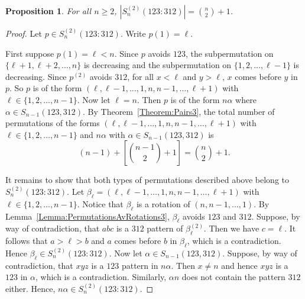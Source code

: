 \documentclass[10pt,a4paper]{amsart}
\newtheorem{proposition}[theorem]{Proposition}
\numberwithin{equation}{section}
\begin{document}
\begin{proposition}
For all $n\geq2$, $|S_n^{(2)}(123:312)|=\binom{n}{2}+1$.
\end{proposition}
\begin{proof}
    Let $p\in S_n^{(2)}(123:312)$. Write $p(1)=\ell$. 
    
    First suppose $p(1)=\ell<n$. Since $p$ avoids $123$, the subpermutation on $\{\ell+1,\ell+2,\ldots,n\}$ is decreasing and the subpermutation on $\{1,2,\ldots,\ell-1\}$ is decreasing. Since $p^{(2)}$ avoids $312$, for all $x<\ell$ and $y>\ell$, $x$ comes before $y$ in $p$. So $p$ is of the form $(\ell,\ell-1,\ldots,1,n,n-1,\ldots,\ell+1)$ with $\ell\in\{1,2,\ldots,n-1\}$. Now let $\ell=n$. Then $p$ is of the form $n\alpha$ where $\alpha\in S_{n-1}(123,312)$. By Theorem~\ref{Theorem:Pairs3}, the total number of permutations of the forms $(\ell,\ell-1,\ldots,1,n,n-1,\ldots,\ell+1)$ with $\ell\in\{1,2,\ldots,n-1\}$ and $n\alpha$ with $\alpha\in S_{n-1}(123,312)$ is
    \[
    (n-1)+\left[\binom{n-1}{2}+1\right]=\binom{n}{2}+1.
    \]

    It remains to show that both types of permutations described above belong to $S_n^{(2)}(123:312)$. Let $\beta_\ell=(\ell,\ell-1,\ldots,1,n,n-1,\ldots,\ell+1)$ with $\ell\in\{1,2,\ldots,n-1\}$. Notice that $\beta_\ell$ is a rotation of $(n,n-1,\ldots,1)$. By Lemma~\ref{Lemma:PermutationsAvRotations3}, $\beta_\ell$ avoids $123$ and $312$. 
Suppose, by way of contradiction, that $abc$ is a $312$ pattern of $\beta_\ell^{(2)}$. Then we have $c=\ell$. It follows that $a>\ell>b$ and $a$ comes before $b$ in $\beta_{\ell}$, which is a contradiction. Hence $\beta_\ell\in S_n^{(2)}(123:312)$. Now let $\alpha\in S_{n-1}(123,312)$. Suppose, by way of contradiction, that $xyz$ is a $123$ pattern in $n\alpha$. Then $x\neq n$ and hence $xyz$ is a $123$ in $\alpha$, which is a contradiction. Similarly, $\alpha n$ does not contain the pattern $312$ either. Hence, $n\alpha\in S_n^{(2)}(123:312)$.
\end{proof}
\end{document}
